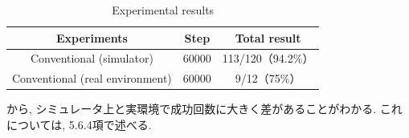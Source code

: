 \begin{table}[hbtp]
  \caption{Experimental results}
  \label{table:result_real_60000}
  \centering
  \begin{tabular}{|c|c|c|}
    \hline
    Experiments & Step & Total result\\
    \hline
    Conventional (simulator) & 60000 & 113/120（94.2\%）\\
    \hline
    Conventional (real environment) & 60000 & 9/12（75\%）\\
    \hline
  \end{tabular}
\end{table}

から, シミュレータ上と実環境で成功回数に大きく差があることがわかる. これについては, 5.6.4項で述べる.


  

  




